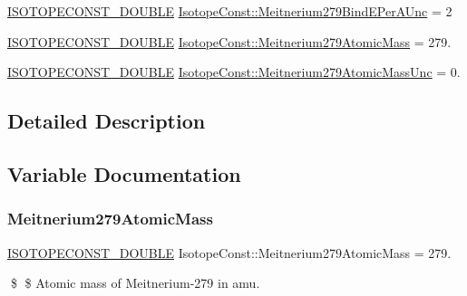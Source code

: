 \begin{DoxyCompactItemize}
\mbox{\hyperlink{group___isotope_const-_macros_ga8f45a7272ce02c0b4c65c44636ed719a}{I\+S\+O\+T\+O\+P\+E\+C\+O\+N\+S\+T\+\_\+\+D\+O\+U\+B\+LE}} \mbox{\hyperlink{group___isotope_const-_meitnerium-_mt279_gaf6e61b10c2eee52102eeca2fe075d3a9}{Isotope\+Const\+::\+Meitnerium279\+Bind\+E\+Per\+A\+Unc}} = 2
\item 
\mbox{\hyperlink{group___isotope_const-_macros_ga8f45a7272ce02c0b4c65c44636ed719a}{I\+S\+O\+T\+O\+P\+E\+C\+O\+N\+S\+T\+\_\+\+D\+O\+U\+B\+LE}} \mbox{\hyperlink{group___isotope_const-_meitnerium-_mt279_gaf8f1da865f0a3974f3c01b886b57f951}{Isotope\+Const\+::\+Meitnerium279\+Atomic\+Mass}} = 279.
\item 
\mbox{\hyperlink{group___isotope_const-_macros_ga8f45a7272ce02c0b4c65c44636ed719a}{I\+S\+O\+T\+O\+P\+E\+C\+O\+N\+S\+T\+\_\+\+D\+O\+U\+B\+LE}} \mbox{\hyperlink{group___isotope_const-_meitnerium-_mt279_ga26259a8ef44cf335841fb46dab35ae20}{Isotope\+Const\+::\+Meitnerium279\+Atomic\+Mass\+Unc}} = 0.
\end{DoxyCompactItemize}


\subsection{Detailed Description}


\subsection{Variable Documentation}
\mbox{\label{group___isotope_const-_meitnerium-_mt279_gaf8f1da865f0a3974f3c01b886b57f951}} 
\subsubsection{\texorpdfstring{Meitnerium279\+Atomic\+Mass}{Meitnerium279AtomicMass}}
{\footnotesize\ttfamily \mbox{\hyperlink{group___isotope_const-_macros_ga8f45a7272ce02c0b4c65c44636ed719a}{I\+S\+O\+T\+O\+P\+E\+C\+O\+N\+S\+T\+\_\+\+D\+O\+U\+B\+LE}} Isotope\+Const\+::\+Meitnerium279\+Atomic\+Mass = 279.}

\$ \$ Atomic mass of Meitnerium-\/279 in amu. \mbox{\label{group___isotope_const-_meitnerium-_mt279_ga26259a8ef44cf335841fb46dab35ae20}} 
